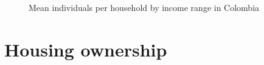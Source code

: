 \documentclass[
  ignorenonframetext,
]{beamer}
\begin{document}
\begin{frame}{}
\label{section-8}
\begin{figure}


\caption{\label{fig-household-size-col}Mean individuals per household by
income range in Colombia}

\end{figure}%
\end{frame}

\section{Housing ownership}\label{housing-ownership}
\end{document}
